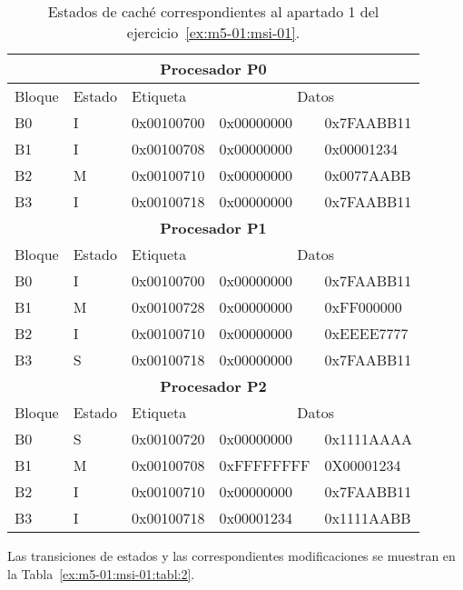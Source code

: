 \begin{table}[htbp]

\begin{tabular}{|l|l|l|l|l|}

\hline
\multicolumn{5}{|c|}{\textbf{Procesador P0}}\\
\hline
Bloque & Estado & Etiqueta & \multicolumn{2}{c|}{Datos}\\
\hline
\hline
B0 & I & 0x00100700 & 0x00000000 & 0x7FAABB11\\
\hline
B1 & I & 0x00100708 & 0x00000000 & 0x00001234\\
\hline
B2 & M & 0x00100710 & 0x00000000 & 0x0077AABB\\
\hline
B3 & I & 0x00100718 & 0x00000000 & 0x7FAABB11\\
\hline

\hline
\multicolumn{5}{|c|}{\textbf{Procesador P1}}\\
\hline
Bloque & Estado & Etiqueta & \multicolumn{2}{c|}{Datos}\\
\hline
\hline

B0 & I & 0x00100700 & 0x00000000 & 0x7FAABB11\\
\hline
B1 & M & 0x00100728 & 0x00000000 & 0xFF000000\\
\hline
B2 & I & 0x00100710 & 0x00000000 & 0xEEEE7777\\
\hline
B3 & S & 0x00100718 & 0x00000000 & 0x7FAABB11\\
\hline


\hline
\multicolumn{5}{|c|}{\textbf{Procesador P2}}\\
\hline
Bloque & Estado & Etiqueta & \multicolumn{2}{c|}{Datos}\\
\hline
\hline

B0 & S & 0x00100720 & 0x00000000 & 0x1111AAAA\\
\hline
B1 & {\color{red}M} & 0x00100708 & {\color{red}0xFFFFFFFF} & 0X00001234\\
\hline
B2 & I & 0x00100710 & 0x00000000 & 0x7FAABB11\\
\hline
B3 & I & 0x00100718 & 0x00001234 & 0x1111AABB\\
\hline


\end{tabular}

\caption{Estados de caché correspondientes al apartado 1 del ejercicio~\ref{ex:m5-01:msi-01}.}
\label{ex:m5-01:msi-01:tabl:1}

\end{table}

Las transiciones de estados y las correspondientes modificaciones se muestran en la Tabla~\ref{ex:m5-01:msi-01:tabl:2}.

